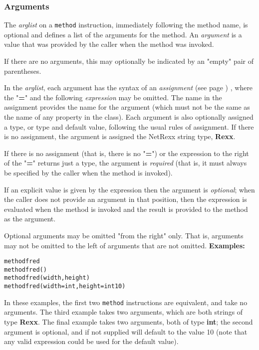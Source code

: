 \subsubsection{Arguments}
 
The \emph{arglist} on a \texttt{method} instruction, immediately
following the method name, is optional and defines a list of the
arguments for the method.  An \emph{argument} is a value that was
provided by the caller when the method was invoked.
 
If there are no arguments, this may optionally be indicated by an
"empty" pair of parentheses.
 
In the \emph{arglist}, each argument has the syntax of an
 \emph{assignment} (see page \pageref{refassign}) , where the "\textbf{=}"
and the following \emph{expression} may be omitted.
The name in the assignment provides the name for the argument (which
must not be the same as the name of any property in the class).
Each argument is also optionally assigned a type, or type and default
value, following the usual rules of assignment.
If there is no assignment, the argument is assigned the NetRexx string
type, \textbf{Rexx}.
 
If there is no assignment (that is, there is no "\textbf{=}") or
the expression to the right of the "\textbf{=}" returns just a
type, the argument is \emph{required} (that is, it must always be
specified by the caller when the method is invoked).
 
If an explicit value is given by the expression then the argument is
\emph{optional}; when the caller does not provide an argument in that
position, then the expression is evaluated when the method is invoked
and the result is provided to the method as the argument.
 
Optional arguments may be omitted "from the right" only.
That is, arguments may not be omitted to the left of arguments that are
not omitted.
 \textbf{Examples:}
\begin{alltt}
method fred
method fred()
method fred(width, height)
method fred(width=int, height=int 10)
\end{alltt}
In these examples, the first two \texttt{method} instructions are
equivalent, and take no arguments.
The third example takes two arguments, which are both strings
of type \textbf{Rexx}.
The final example takes two arguments, both of type \textbf{int}; the
second argument is optional, and if not supplied will default to the
value 10 (note that any valid expression could be used for the default
value).
